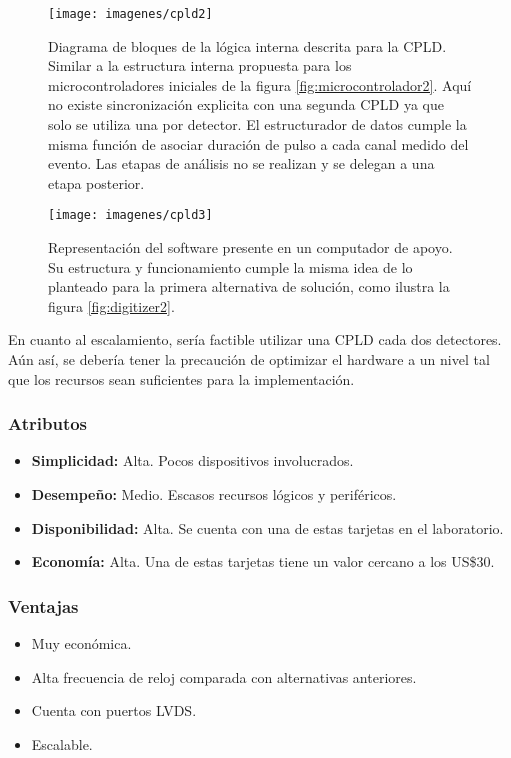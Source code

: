 \begin{figure}[H]
    \centering
    \texttt{[image: imagenes/cpld2]}
    \caption{Diagrama de bloques de la lógica interna descrita para la CPLD. Similar a la estructura interna propuesta para los microcontroladores iniciales de la figura \ref{fig:microcontrolador2}. Aquí no existe sincronización explicita con una segunda CPLD ya que solo se utiliza una por detector. El estructurador de datos cumple la misma función de asociar duración de pulso a cada canal medido del evento. Las etapas de análisis no se realizan y se delegan a una etapa posterior.}
    \label{fig:cpld2}
\end{figure}

\newpage
\begin{figure}[H]
    \centering
    \texttt{[image: imagenes/cpld3]}
    \caption{Representación del software presente en un computador de apoyo. Su estructura y funcionamiento cumple la misma idea de lo planteado para la primera alternativa de solución, como ilustra la figura \ref{fig:digitizer2}.}
    \label{fig:cpld3}
\end{figure}


\par En cuanto al escalamiento, sería factible utilizar una CPLD cada dos detectores. Aún así, se debería tener la precaución de optimizar el hardware a un nivel tal que los recursos sean suficientes para la implementación.

\subsubsection*{Atributos}
\begin{itemize}
    \item \textbf{Simplicidad:  } Alta. Pocos dispositivos involucrados.
    \item \textbf{Desempeño:}  Medio. Escasos recursos lógicos y periféricos.
    \item \textbf{Disponibilidad:}  Alta. Se cuenta con una de estas tarjetas en el laboratorio.
    \item \textbf{Economía: } Alta. Una de estas tarjetas tiene un valor cercano a los US\$30.
\end{itemize}

\subsubsection*{Ventajas}
\begin{itemize}
    \item Muy económica.
    \item Alta frecuencia de reloj comparada con alternativas anteriores.
    \item Cuenta con puertos LVDS.
    \item Escalable.
\end{itemize}


